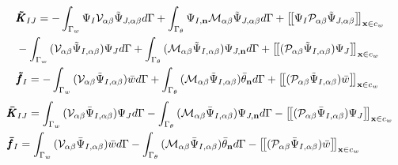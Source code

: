 \documentclass[a4paper]{article}
\begin{document}
\begin{equation}
    \begin{split}
   &{{\pmb{\tilde K}}_{IJ}} =  - \int_{{\Gamma _w}}^{} {{\Psi _I}{{\cal V}_{\alpha \beta }}{{\tilde \Psi }_{J,\alpha \beta }}d\Gamma }  + \int_{{\Gamma _\theta }}^{} {{\Psi _{I,{\bf{n}}}}{{\cal M}_{\alpha \beta }}{{\tilde \Psi }_{J,\alpha \beta }}d\Gamma  + {{\left[\kern-0.15em\left[ {{\Psi _I}{{\cal P}_{\alpha \beta }}{{\tilde \Psi }_{J,\alpha \beta }}} 
     \right]\kern-0.15em\right]}_{{\bf{x}} \in {c_w}}}} \\
     &- \int_{{\Gamma _w}}^{} {({{\cal V}_{\alpha \beta }}{{\tilde \Psi }_{I,\alpha \beta }}){\Psi _J}d\Gamma }  + \int_{{\Gamma _\theta }}^{} {({{\cal M}_{\alpha \beta }}{{\tilde \Psi }_{I,\alpha \beta }}){\Psi _{J,{\bf{n}}}}d\Gamma }  + {\left[\kern-0.15em\left[ {({{\cal P}_{\alpha \beta }}{{\tilde \Psi }_{I,\alpha \beta }}){\Psi _J}} 
     \right]\kern-0.15em\right]_{{\bf{x}} \in {c_w}}}\\
    &{{{\pmb{\tilde f}_I}} = - \int_{{\Gamma _w}}^{} {({{\cal V}_{\alpha \beta }}{{\tilde \Psi }_{I,\alpha \beta }})\bar wd\Gamma }  + \int_{{\Gamma _\theta }}^{} {({{\cal M}_{\alpha \beta }}{{\tilde \Psi }_{I,\alpha \beta }}){{\bar \theta }_{\bf{n}}}d\Gamma }  + {{\left[\kern-0.15em\left[ {({{\cal P}_{\alpha \beta }}{{\tilde \Psi }_{I,\alpha \beta }})\bar w} 
     \right]\kern-0.15em\right]}_{{\bf{x}} \in {c_w}}}}
    \end{split}
    \end{equation}
\begin{equation}
\begin{split}
        &{{{\pmb{\bar K}_{IJ}}} = \int_{{\Gamma _w}}^{} {({{\cal V}_{\alpha \beta }}{{\bar \Psi }_{I,\alpha \beta }}){\Psi _J}d\Gamma }  - \int_{{\Gamma _\theta }}^{} {({{\cal M}_{\alpha \beta }}{{\bar \Psi }_{I,\alpha \beta }}){\Psi _{J,{\bf{n}}}}d\Gamma }  - {{\left[\kern-0.15em\left[ {({{\cal P}_{\alpha \beta }}{{\bar \Psi }_{I,\alpha \beta }}){\Psi _J}} 
         \right]\kern-0.15em\right]}_{{\bf{x}} \in {c_w}}}}\\
        &{{{\pmb{\bar f}_I}} = \int_{{\Gamma _w}}^{} {({{\cal V}_{\alpha \beta }}{{\bar \Psi }_{I,\alpha \beta }})\bar wd\Gamma }  - \int_{{\Gamma _\theta }}^{} {({{\cal M}_{\alpha \beta }}{{\bar \Psi }_{I,\alpha \beta }}){{\bar \theta }_{\bf{n}}}d\Gamma }  - {{\left[\kern-0.15em\left[ {({{\cal P}_{\alpha \beta }}{{\bar \Psi }_{I,\alpha \beta }})\bar w} 
         \right]\kern-0.15em\right]}_{{\bf{x}} \in {c_w}}}}
\end{split}
\end{equation}
\end{document}
